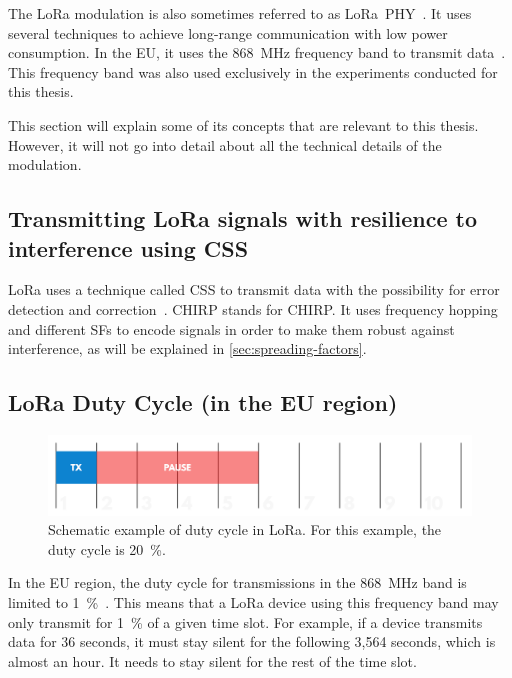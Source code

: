 The \ac{LoRa} modulation is also sometimes referred to as \ac{LoRa}\ PHY~\cite{chaudhari_understanding_2022}.
It uses several techniques to achieve long-range communication with low power consumption.
In the \ac{EU}, it uses the \SI{868}{\mega\hertz} frequency band to transmit data~\cite{lora_alliance_inc_lorawan_regional_2017}.
This frequency band was also used exclusively in the experiments conducted for this thesis.

This section will explain some of its concepts that are relevant to this thesis.
However, it will not go into detail about all the technical details of the modulation.

\subsection{Transmitting \acs{LoRa} signals with resilience to interference using \acf{CSS}}\label{sec:chirp-spread-spectrum}

\ac{LoRa} uses a technique called \acl{CSS} to transmit data with the possibility for error detection and correction~\cite{reynders_chirp_2016}.
\acs{CHIRP} stands for \acl{CHIRP}.
It uses frequency hopping and different \aclp{SF} to encode signals in order to make them robust against interference, as will be explained in \cref{sec:spreading-factors}.

\subsection{\acs{LoRa} Duty Cycle (in the \acs{EU} region)}\label{sec:duty-cycle}

\begin{figure}[htbp]
    \centering
    \includegraphics[width=.8\textwidth]{pictures/lora/duty-cycle-single-channel-off-air.png}
    \caption{
        Schematic example of duty cycle in \ac{LoRa}.
        For this example, the duty cycle is \SI{20}{\percent}.~\protect\cite{the_things_industries_bv_duty_nodate}
    }\label{pic:lora-duty-cycle}
\end{figure}

In the \ac{EU} region, the duty cycle for transmissions in the \SI{868}{\mega\hertz} band is limited to \SI{1}{\percent}~\cite[p. 29]{etsi_etsi_2012}.
This means that a \ac{LoRa} device using this frequency band may only transmit for \SI{1}{\percent} of a given time slot.
For example, if a device transmits data for 36 seconds, it must stay silent for the following 3,564 seconds, which is almost an hour.
It needs to stay silent for the rest of the time slot.


